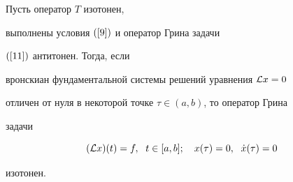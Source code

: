 \begin{thms}


Пусть оператор $T$ изотонен,


выполнены условия $(\ref{9})$ и оператор Грина задачи


$(\ref{11})$ антитонен. Тогда, если


вронскиан фундаментальной системы решений уравнения ${\cal L} x=0$


отличен от нуля в некоторой точке $\tau\in(a,b)$, то оператор Грина


задачи


\begin{equation}\label{tbvp}


(\L x)(t)=f,\ \; t\in[a,b];\quad


x(\tau)=0,\ \; \Dot x(\tau)=0


\end{equation}


изотонен.


\end{thms}





